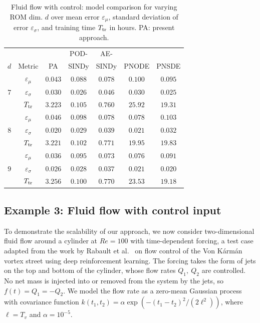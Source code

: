 \documentclass{article}
\begin{document}
	\begin{table}[t]
		\centering
		\caption{Fluid flow with control: model comparison for varying ROM dim. $d$ over mean error $\varepsilon_\mu$, standard deviation of error $\varepsilon_\sigma$, and training time $T_{\rm tr}$ in hours. PA: present approach.}
		\label{tab:flowcontrol_comparison}
		\begin{tabular}{cc|ccccc}
			\toprule
			& & & POD- & AE- & & \\
			$d$ & Metric & PA & SINDy & SINDy & PNODE & PNSDE \\
			\midrule
			& $\varepsilon_\mu$ & $0.043$ & $0.088$ & $0.078$ & $0.100$ & $0.095$ \\
			$7$ & $\varepsilon_\sigma$ & $0.030$ & $0.026$ & $0.046$ & $0.030$ & $0.025$ \\
			& $T_{\rm tr}$ & $3.223$ & $0.105$ & $0.760$ & $25.92$ & $19.31$ \\
			\midrule
			& $\varepsilon_\mu$ & $0.046$ & $0.098$ & $0.078$ & $0.078$ & $0.103$ \\
			$8$ & $\varepsilon_\sigma$ & $0.020$ & $0.029$ & $0.039$ & $0.021$ & $0.032$ \\
			& $T_{\rm tr}$ & $3.221$ & $0.102$ & $0.771$ & $19.95$ & $19.83$ \\
			\midrule
			& $\varepsilon_\mu$ & $0.036$ & $0.095$ & $0.073$ & $0.076$ & $0.091$ \\
			$9$ & $\varepsilon_\sigma$ & $0.026$ & $0.028$ & $0.037$ & $0.021$ & $0.020$ \\
			& $T_{\rm tr}$ & $3.256$ & $0.100$ & $0.770$ & $23.53$ & $19.18$ \\
			\bottomrule
		\end{tabular}
	\end{table}
	
	\subsection*{Example 3: Fluid flow with control input}
	
	To demonstrate the scalability of our approach, we now consider two-dimensional fluid flow around a cylinder at $Re=100$ with time-dependent forcing, a test case adapted from the work by Rabault et al.~\cite{Rabault_2019_Flow_Control_DRL} on flow control of the Von K\'{a}rm\'{a}n vortex street using deep reinforcement learning. The forcing takes the form of jets on the top and bottom of the cylinder, whose flow rates $Q_1,\ Q_2$ are controlled. No net mass is injected into or removed from the system by the jets, so $f(t) = Q_1 = -Q_2$. We model the flow rate as a zero-mean Gaussian process with covariance function $k(t_1, t_2) = \alpha \exp{(-(t_1 - t_2)^2/(2 \ell^2))}$, 
	where $\ell = T_v$ and $\alpha = 10^{-5}$.
	
\end{document}
